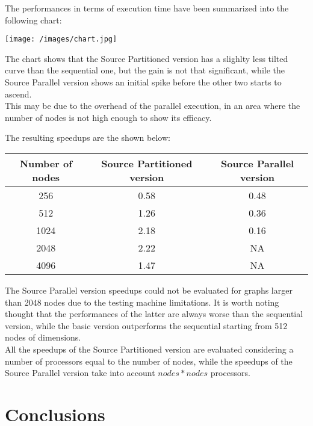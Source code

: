 \documentclass[
	a4paper, %
	12pt, %
]{class}
\begin{document}
The performances in terms of execution time have been summarized into the following chart:

\begin{center}
    \texttt{[image: /images/chart.jpg]}
\end{center}

The chart shows that the Source Partitioned version has a slighlty less tilted curve than the sequential one, but the gain is not
that significant, while the Source Parallel version shows an initial spike before the other two starts to ascend. \\

This may be due to the overhead of the parallel execution, in an area where the number of nodes is not high enough to show its efficacy.
\newpage

The resulting speedups are the shown below:

\begin{center}
    \begin{tabular}{ |c|c|c| }
    \hline
    \textbf{Number of nodes} & \textbf{Source Partitioned version} & \textbf{Source Parallel version} \\ \hline
    256 & 0.58  & 0.48 \\ \hline
    512 & 1.26 & 0.36 \\ \hline
    1024 & 2.18 & 0.16 \\ \hline
    2048 & 2.22 & NA \\ \hline
    4096 & 1.47 & NA \\ \hline
    \end{tabular}
\end{center}

The Source Parallel version speedups could not be evaluated for graphs larger than 2048 nodes due to the testing machine
limitations. It is worth noting thought that the performances of the latter are always worse than the sequential version, while the basic
version outperforms the sequential starting from 512 nodes of dimensions. \\

All the speedups of the Source Partitioned version are evaluated considering a number of processors equal to the number of nodes, while the speedups
of the Source Parallel version take into account $nodes * nodes$ processors.

\section{Conclusions}
\end{document}
